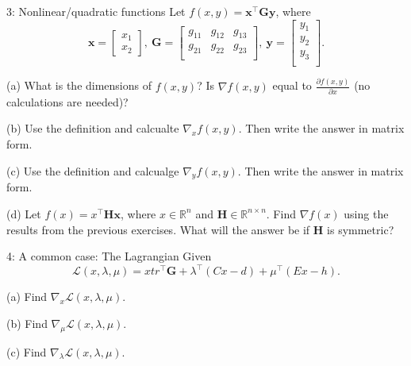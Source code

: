 \documentclass{article}
\begin{document}
\begin{problem}{3: Nonlinear/quadratic functions}
Let $f(x,y)=\mathbf{x^{\top}Gy}$, where
\[
\mathbf{x} = \begin{bmatrix}
  x_1 \\ x_2
\end{bmatrix}
,\ 
\mathbf{G} = \begin{bmatrix}
  g_{11} & g_{12} & g_{13} \\
  g_{21} & g_{22} & g_{23} \\
\end{bmatrix}
,\ 
\mathbf{y} = \begin{bmatrix}
  y_1 \\ y_2 \\ y_3\\
\end{bmatrix}
.\] 

(a) What is the dimensions of $f(x,y)$? Is $\nabla f(x,y)$ equal to $\frac{\partial f(x,y)}{\partial x}$ (no calculations are needed)?

\medskip

(b) Use the definition and calcualte $\nabla_x f(x,y)$. Then write the answer in matrix form.

\medskip

(c) Use the definition and calcualge $\nabla_y f(x,y)$. Then write the answer in matrix form.

\medskip

(d) Let $f(x) = x^{\top}\mathbf{Hx}$, where $x \in \mathbb{R}^{n}$ and $\mathbf{H} \in \mathbb{R}^{n \times n}$. Find $\nabla f(x)$ using the results from 
the previous exercises. What will the answer be if $\mathbf{H}$ is symmetric?
\end{problem}

\begin{problem}{4: A common case: The Lagrangian}
Given
\[
\mathcal{L}(x, \lambda, \mu) = xtr^{\top}\mathbf{G} + \lambda^{\top}(Cx - d) + \mu^{\top}(Ex - h)
.\] 

(a) Find $\nabla_x\mathcal{L}(x, \lambda, \mu)$.

\medskip

(b) Find $\nabla_{\mu}\mathcal{L}(x, \lambda, \mu)$.

\medskip

(c) Find $\nabla_{\lambda}\mathcal{L}(x, \lambda, \mu)$.
\end{problem}
\end{document}

